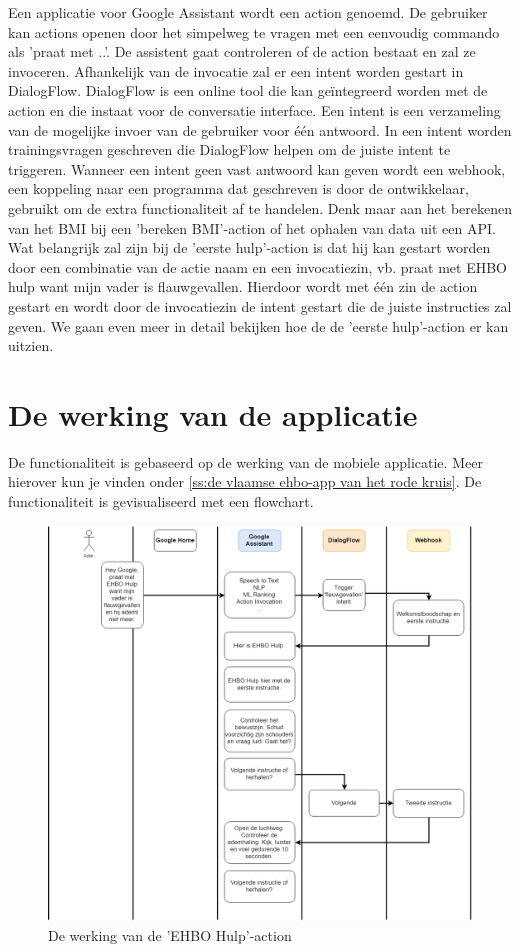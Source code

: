 Een applicatie voor Google Assistant wordt een action genoemd. De gebruiker kan actions openen door het simpelweg te vragen met een eenvoudig commando als 'praat met ..'. De assistent gaat controleren of de action bestaat en zal ze invoceren. Afhankelijk van de invocatie zal er een intent worden gestart in DialogFlow. DialogFlow is een online tool die kan geïntegreerd worden met de action en die instaat voor de conversatie interface. Een intent is een verzameling van de mogelijke invoer van de gebruiker voor één antwoord. In een intent worden trainingsvragen geschreven die DialogFlow helpen om de juiste intent te triggeren. Wanneer een intent geen vast antwoord kan geven wordt een webhook, een koppeling naar een programma dat geschreven is door de ontwikkelaar, gebruikt om de extra functionaliteit af te handelen. Denk maar aan het berekenen van het BMI bij een 'bereken BMI'-action of het ophalen van data uit een API.
Wat belangrijk zal zijn bij de 'eerste hulp'-action is dat hij kan gestart worden door een combinatie van de actie naam en een invocatiezin, vb. praat met EHBO hulp want mijn vader is flauwgevallen. Hierdoor wordt met één zin de action gestart en wordt door de invocatiezin de intent gestart die de juiste instructies zal geven. We gaan even meer in detail bekijken hoe de de 'eerste hulp'-action er kan uitzien.

\section{De werking van de applicatie}
De functionaliteit is gebaseerd op de werking van de mobiele applicatie. Meer hierover kun je vinden onder \ref{ss:de vlaamse ehbo-app van het rode kruis}. De functionaliteit is gevisualiseerd met een flowchart.

\begin{figure}[h]
    \includegraphics[width=0.7\linewidth]{img/gaflowehbo}
    \caption{De werking van de 'EHBO Hulp'-action}
    \label{fig:gaflowehbo}
\end{figure}

